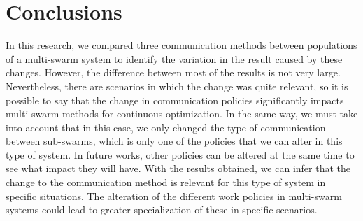 \documentclass[runningheads]{llncs}
\begin{document}
\section{Conclusions}
In this research, we compared three communication methods between populations of a multi-swarm system to identify the variation in the result caused by these changes. However, the difference between most of the results is not very large. Nevertheless, there are scenarios in which the change was quite relevant, so it is possible to say that the change in communication policies significantly impacts multi-swarm methods for continuous optimization. In the same way, we must take into account that in this case, we only changed the type of communication between sub-swarms, which is only one of the policies that we can alter in this type of system. In future works, other policies can be altered at the same time to see what impact they will have. With the results obtained, we can infer that the change to the communication method is relevant for this type of system in specific situations. The alteration of the different work policies in multi-swarm systems could lead to greater specialization of these in specific scenarios.



\begin{thebibliography}{4}

\printbibliography


\end{thebibliography}
\end{document}
